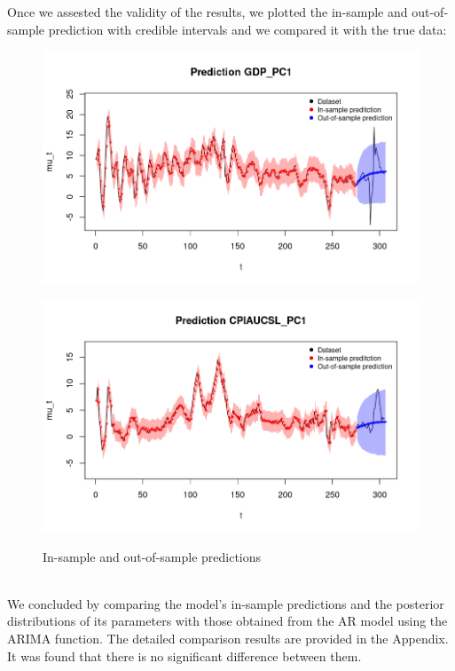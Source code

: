 Once we assested the validity of the results, we plotted the in-sample and out-of-sample prediction with credible intervals and we compared it with the true data: \\
\begin{figure}[H]
    \centering
    \begin{minipage}[H]{0.7\textwidth}
        \centering
        \includegraphics[width=\textwidth]{../Images/2-AR/gdp_prediction.png}
        \label{fig:first}
    \end{minipage}
    \begin{minipage}[H]{0.7\textwidth}
        \centering
        \includegraphics[width=\textwidth]{../Images/2-AR/infl_prediction.png}
        \label{fig:second}
    \end{minipage}
    \caption{In-sample and out-of-sample predictions}
    \label{fig:combined}
\end{figure} \\

We concluded by comparing the model's in-sample predictions and the posterior distributions of its parameters with those obtained from the AR model using the ARIMA function. The detailed comparison results are provided in the Appendix. It was found that there is no significant difference between them. 